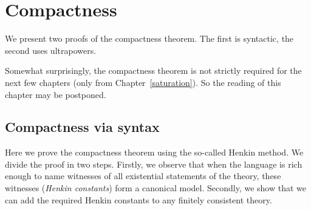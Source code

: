 \documentclass[creche.tex]{subfiles}
\begin{document}
\chapter{Compactness}
\label{compactness}

\def\medrel#1{\parbox[t]{6ex}{$\displaystyle\hfil #1$}}
\def\ceq#1#2#3{\parbox{20ex}{$\displaystyle #1$}\medrel{#2}$\displaystyle  #3$}

We present two proofs of the compactness theorem. The first is syntactic, the second uses ultrapowers.

Somewhat surprisingly, the compactness theorem is not strictly required for the next few chapters (only from Chapter~\ref{saturation}). So the reading of this chapter may be postponed.

\section{Compactness via syntax}

Here we prove the compactness theorem using the so-called Henkin method. We divide the proof in two steps. Firstly, we observe that when the language is rich enough to name witnesses of all existential statements of the theory, these witnesses (\textit{Henkin constants\/}) form a canonical model. Secondly, we show that we can add the required Henkin constants to any finitely consistent theory.
\end{document}
